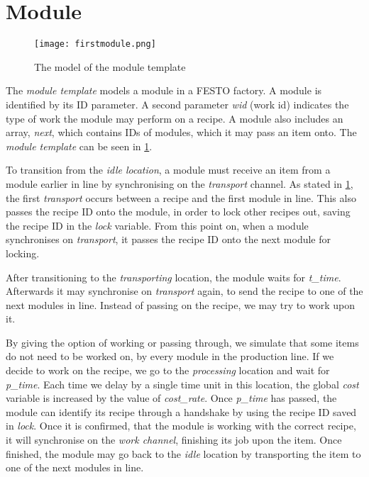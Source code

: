 \section{Module}
\label{subs:module}

\begin{figure}[h]
\centering
\texttt{[image: firstmodule.png]}
\caption{The model of the module template}
\label{fig:firstmodule}
\end{figure}

The \emph{module template} models a module in a FESTO factory. A module is identified by its ID parameter. A second parameter \emph{wid} (work id) indicates the type of work the module may perform on a recipe. A module also includes an array, \emph{next}, which contains IDs of modules, which it may pass an item onto. The \emph{module template} can be seen in \cref{fig:firstmodule}.


To transition from the \emph{idle location}, a module must receive an item from a module earlier in line by synchronising on the \emph{transport} channel.
As stated in \cref{subs:module}, the first \emph{transport} occurs between a recipe and the first module in line. This also passes the recipe ID onto the module, in order to lock other recipes out, saving the recipe ID in the \emph{lock} variable. From this point on, when a module synchronises on \emph{transport}, it passes the recipe ID onto the next module for locking.

After transitioning to the \emph{transporting} location, the module waits for \emph{t\_time}. Afterwards it may synchronise on \emph{transport} again, to send the recipe to one of the next modules in line. Instead of passing on the recipe, we may try to work upon it.

By giving the option of working or passing through, we simulate that some items do not need to be worked on, by every module in the production line. If we decide to work on the recipe, we go to the \emph{processing} location and wait for \emph{p\_time}. Each time we delay by a single time unit in this location, the global \emph{cost} variable is increased by the value of \emph{cost\_rate}. Once \emph{p\_time} has passed, the module can identify its recipe through a handshake by using the recipe ID saved in \emph{lock}. Once it is confirmed, that the module is working with the correct recipe, it will synchronise on the \emph{work channel}, finishing its job upon the item. Once finished, the module may go back to the \emph{idle} location by transporting the item to one of the next modules in line.

